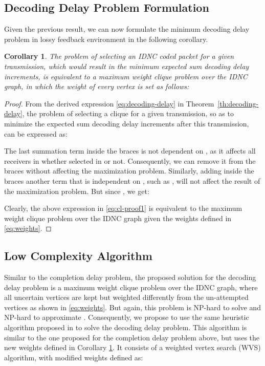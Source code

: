 \documentclass[10pt,jounral]{IEEEtran}
\newtheorem{corollary}{Corollary}
\newcommand{\thref}[1]{Theorem~\ref{#1}}
\newcommand{\ignore}[1]{}
\begin{document}
\subsection{Decoding Delay Problem Formulation}
Given the previous result, we can now formulate the minimum decoding delay problem in lossy feedback environment in the following corollary.
\begin{corollary} \label{th:DD-formulation}
The problem of selecting an IDNC coded packet for a given transmission, which would result in the minimum expected sum decoding delay increments\ignore{ after this transmission}, is equivalent to a maximum weight clique problem over the IDNC graph, in which the weight  of every vertex  is set as follows:

\end{corollary}
\begin{proof}
From the derived expression \eqref{eq:decoding-delay} in \thref{th:decoding-delay}, the problem of selecting a clique  for a given transmission, so as to minimize the expected sum decoding delay increments after this transmission, can be expressed as:
\begin{singlecol}

\end{singlecol}
\begin{doublecol}

\end{doublecol}
The last summation term inside the braces is not dependent on , as it affects all receivers in  whether selected in  or not. Consequently, we can remove it from the braces without affecting the maximization problem. Similarly, adding inside the braces another term that is independent on , such as , will not affect the result of the maximization problem. But since , we get:

Clearly, the above expression in \eqref{eq:cl-proof1} is equivalent to the maximum weight clique problem over the IDNC graph given the weights  defined in \eqref{eq:weights}.
\end{proof}

\subsection{Low Complexity Algorithm}
Similar to the completion delay problem, the proposed solution for the decoding delay problem is a maximum weight clique problem over the IDNC graph, where all uncertain vertices are kept but weighted differently from the un-attempted vertices as shown in \eqref{eq:weights}. But again, this problem is NP-hard to solve \cite{Garey1979} and NP-hard to approximate \cite{Ausiello1999}. Consequently, we propose to use the same heuristic algorithm proposed in \cite{GC10} to solve the decoding delay problem\ignore{ in perfect feedback scenarios}. This algorithm is similar to the one proposed for the completion delay problem above, but uses the new weights defined in Corollary \ref{th:DD-formulation}. It consists of a weighted vertex search (WVS) algorithm, with modified weights defined as:
\end{document}
